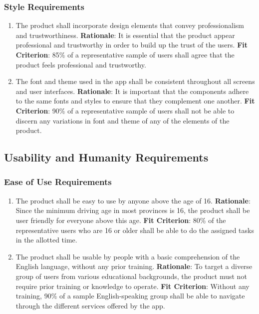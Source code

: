 \documentclass[12pt]{article}
\begin{document}
\subsubsection{Style Requirements}
\begin{enumerate}[nfr]
    \item The product shall incorporate design elements that convey professionalism and trustworthiness.
    \newline \textbf{Rationale}: It is essential that the product appear professional and trustworthy in order to build up the trust of the users.
    \newline \textbf{Fit Criterion}: 85\% of a representative sample of users shall agree that the product feels professional and trustworthy.

    \item The font and theme used in the app shall be consistent throughout all screens and user interfaces.
    \newline \textbf{Rationale}: It is important that the components adhere to the same fonts and styles to ensure that they complement one another.
    \newline \textbf{Fit Criterion}: 90\% of a representative sample of users shall not be able to discern any variations in font and theme of any of the elements of the product.
\end{enumerate}

\subsection{Usability and Humanity Requirements}
\subsubsection{Ease of Use Requirements}
\begin{enumerate}[nfr]
    \item The product shall be easy to use by anyone above the age of 16.
    \newline \textbf{Rationale}: Since the minimum driving age in most provinces is 16, the product shall be user friendly for everyone above this age.
    \newline \textbf{Fit Criterion}: 80\% of the representative users who are 16 or older shall be able to do the assigned tasks in the allotted time.
    \item The product shall be usable by people with a basic comprehension of the English language, without any prior training. 
    \newline \textbf{Rationale}: To target a diverse group of users from various educational backgrounds, the product must not require prior training or knowledge to operate.
    \newline \textbf{Fit Criterion}: Without any training, 90\% of a sample English-speaking group shall be able to navigate through the different services offered by the app. 
\end{enumerate}
\end{document}
